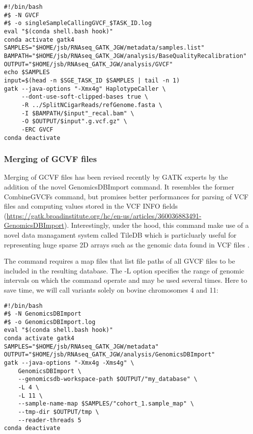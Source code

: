 \begin{verbatim}
#!/bin/bash
#$ -N GVCF
#$ -o singleSampleCallingGVCF_$TASK_ID.log
eval "$(conda shell.bash hook)"
conda activate gatk4
SAMPLES="$HOME/jsb/RNAseq_GATK_JGW/metadata/samples.list"
BAMPATH="$HOME/jsb/RNAseq_GATK_JGW/analysis/BaseQualityRecalibration"
OUTPUT="$HOME/jsb/RNAseq_GATK_JGW/analysis/GVCF"
echo $SAMPLES
input=$(head -n $SGE_TASK_ID $SAMPLES | tail -n 1)
gatk --java-options "-Xmx4g" HaplotypeCaller \
	 --dont-use-soft-clipped-bases true \
	 -R ../SplitNCigarReads/refGenome.fasta \
	 -I $BAMPATH/$input"_recal.bam" \
	 -O $OUTPUT/$input".g.vcf.gz" \
	 -ERC GVCF
conda deactivate
\end{verbatim}



\subsubsection{Merging of GCVF files}

Merging of GCVF files has been revised recently by GATK experts by the addition of the novel GenomicsDBImport command. It resembles the former CombineGVCFs command, but promises better performances for parsing of VCF files and computing values stored in the VCF INFO fields (\href{https://gatk.broadinstitute.org/hc/en-us/articles/360036883491-GenomicsDBImport}{https://gatk.broadinstitute.org/hc/en-us/articles/360036883491-GenomicsDBImport}). Interestingly, under the hood, this command make use of a novel data managament system called  TileDB which is particluarly useful for representing huge sparse 2D arrays such as the genomic data found in VCF files \cite{Papadopoulos2016}. 


The command requires a map files that list file paths of all GVCF files to be included in the resulting database. The -L option specifies the range of genomic intervals on which the command operate and may be used several times. Here to save time, we will call variants solely on bovine chromosomes 4 and 11:

\begin{verbatim}
#!/bin/bash
#$ -N GenomicsDBImport
#$ -o GenomicsDBImport.log
eval "$(conda shell.bash hook)"
conda activate gatk4
SAMPLES="$HOME/jsb/RNAseq_GATK_JGW/metadata"
OUTPUT="$HOME/jsb/RNAseq_GATK_JGW/analysis/GenomicsDBImport"
gatk --java-options "-Xmx4g -Xms4g" \
	GenomicsDBImport \
	--genomicsdb-workspace-path $OUTPUT/"my_database" \
	-L 4 \
	-L 11 \
	--sample-name-map $SAMPLES/"cohort_1.sample_map" \
	--tmp-dir $OUTPUT/tmp \
	--reader-threads 5
conda deactivate
\end{verbatim}


